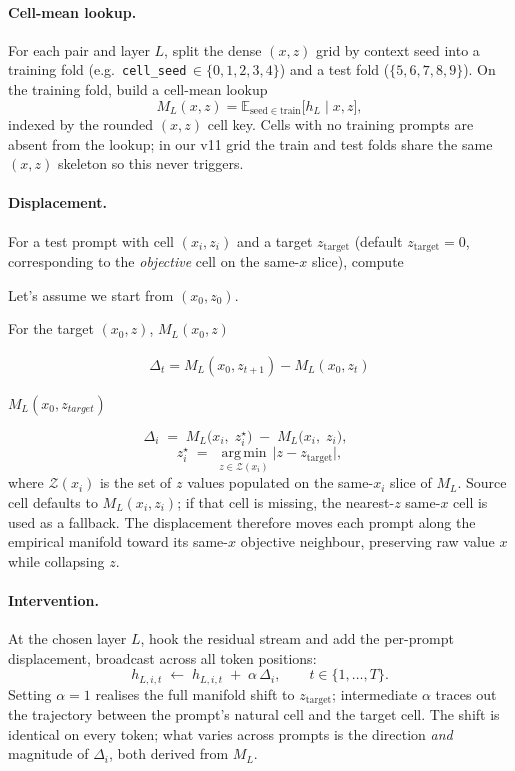 \documentclass{article}
\begin{document}
\paragraph{Cell-mean lookup.}
For each pair and layer $L$, split the dense $(x,z)$ grid by context seed into a training fold (e.g.\ \texttt{cell\_seed}\,$\in\{0,1,2,3,4\}$) and a test fold ($\{5,6,7,8,9\}$).
On the training fold, build a cell-mean lookup
\[
M_L(x,z)=\mathbb{E}_{\mathrm{seed}\in\text{train}}\bigl[h_L\mid x,z\bigr],
\]
indexed by the rounded $(x,z)$ cell key.
Cells with no training prompts are absent from the lookup; in our v11 grid the train and test folds share the same $(x,z)$ skeleton so this never triggers.

\paragraph{Displacement.}
For a test prompt with cell $(x_i,z_i)$ and a target $z_{\text{target}}$ (default $z_{\text{target}}=0$, corresponding to the \emph{objective} cell on the same-$x$ slice), compute



Let's assume we start from $(x_0, z_0)$.

For the target $(x_0, z)$,
$M_L(x_0, z)$

\begin{align}
    \Delta_t = M_L(x_0, z_{t+1}) - M_L(x_0, z_t)
\end{align}

$M_L(x_0, z_{target})$

\[
\Delta_i \;=\; M_L\!\bigl(x_i,\;z^\star_i\bigr)\;-\;M_L\!\bigl(x_i,\;z_i\bigr), \qquad
\]
\[
z^\star_i \;=\;\operatorname*{arg\,min}_{z\in\mathcal{Z}(x_i)}\bigl|z-z_{\text{target}}\bigr|,
\]
where $\mathcal{Z}(x_i)$ is the set of $z$ values populated on the same-$x_i$ slice of $M_L$.
Source cell defaults to $M_L(x_i,z_i)$; if that cell is missing, the nearest-$z$ same-$x$ cell is used as a fallback. The displacement therefore moves each prompt along the empirical manifold toward its same-$x$ objective neighbour, preserving raw value $x$ while collapsing $z$.

\paragraph{Intervention.}
At the chosen layer $L$, hook the residual stream and add the per-prompt displacement, broadcast across all token positions:
\[
h_{L,i,t} \;\leftarrow\; h_{L,i,t}\;+\;\alpha\,\Delta_i,
\qquad t\in\{1,\dots,T\}.
\]
Setting $\alpha=1$ realises the full manifold shift to $z_{\text{target}}$; intermediate $\alpha$ traces out the trajectory between the prompt's natural cell and the target cell. The shift is identical on every token; what varies across prompts is the direction \emph{and} magnitude of $\Delta_i$, both derived from $M_L$.
\end{document}
